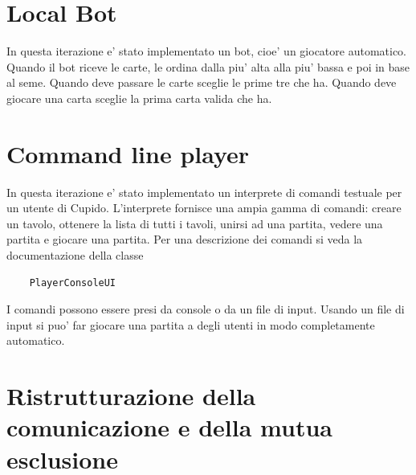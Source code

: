 \section{Local Bot}
  In questa iterazione e' stato implementato un bot, cioe' un giocatore automatico. Quando il bot riceve le carte, le ordina dalla piu' alta alla piu' bassa e poi in base al seme. Quando deve passare le carte sceglie le prime tre che ha. Quando deve giocare una carta sceglie la prima carta valida che ha.

\section{Command line player}
  In questa iterazione e' stato implementato un interprete di comandi testuale per un utente di Cupido. L'interprete fornisce una ampia gamma di comandi: creare un tavolo, ottenere la lista di tutti i tavoli, unirsi ad una partita, vedere una partita e giocare una partita. Per una descrizione dei comandi si veda la documentazione della classe
  \begin{verbatim}
    PlayerConsoleUI
  \end{verbatim}
  I comandi possono essere presi da console o da un file di input. Usando un file di input si puo' far giocare una partita a degli utenti in modo completamente automatico.

\section{Ristrutturazione della comunicazione e della mutua esclusione}
  

